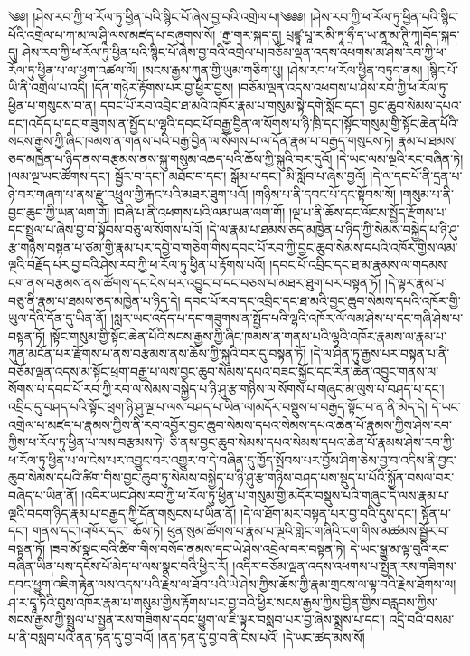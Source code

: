 \setcounter{footnote}{0} 
༄༅། །ཤེས་རབ་ཀྱི་ཕ་རོལ་ཏུ་ཕྱིན་པའི་སྙིང་པོ་ཞེས་བྱ་བའི་འགྲེལ་པ།༄༅༅། །ཤེས་རབ་ཀྱི་ཕ་རོལ་ཏུ་ཕྱིན་པའི་སྙིང་པོའི་འགྲེལ་པ་ཀ་མ་ལ་ཤཱི་ལས་མཛད་པ་བཞུགས་སོ། །རྒྱ་གར་སྐད་དུ། པྲཛྙཱ་པཱ་ར་མི་ཏཱ་ཧྲྀ་ད་ཡ་ནཱ་མ་ཊཱི་ཀཱ།བོད་སྐད་དུ། ཤེས་རབ་ཀྱི་ཕ་རོལ་ཏུ་ཕྱིན་པའི་སྙིང་པོ་ཞེས་བྱ་བའི་འགྲེལ་པ།བཅོམ་ལྡན་འདས་འཕགས་མ་ཤེས་རབ་ཀྱི་ཕ་རོལ་ཏུ་ཕྱིན་པ་ལ་ཕྱག་འཚལ་ལོ། །སངས་རྒྱས་ཀུན་གྱི་ཡུམ་གཅིག་པུ། །ཤེས་རབ་ཕ་རོལ་ཕྱིན་བཏུད་ནས། །སྙིང་པོ་ཡི་ནི་འགྲེལ་པ་འདི། །དོན་གཉེར་རྟོགས་པར་བྱ་ཕྱིར་བྱས། །བཅོམ་ལྡན་འདས་འཕགས་པ་ཤེས་རབ་ཀྱི་ཕ་རོལ་ཏུ་ཕྱིན་པ་གསུངས་བ་ན། དབང་པོ་རབ་འབྲིང་ཐ་མའི་འཁོར་རྣམ་པ་གསུམ་སྟེ་དགེ་སློང་དང་། བྱང་ཆུབ་སེམས་དཔའ་དང་།འདོད་པ་དང་གཟུགས་ན་སྤྱོད་པ་ལྷའི་དབང་པོ་བརྒྱ་བྱིན་ལ་སོགས་པ་ཉི་ཁྲི་དང་།སྟོང་གསུམ་གྱི་སྟོང་ཆེན་པོའི་སངས་རྒྱས་ཀྱི་ཞིང་ཁམས་ན་གནས་པའི་བརྒྱ་བྱིན་ལ་སོགས་པ་ལ་དོན་རྣམ་པ་བརྒྱད་གསུངས་ཏེ། རྣམ་པ་ཐམས་ཅད་མཁྱེན་པ་ཉིད་ནས་བརྩམས་ནས་སྐུ་གསུམ་འཆད་པའི་ཆོས་ཀྱི་སྐུའི་བར་དུའོ། །དེ་ཡང་ལམ་ལྔའི་རང་བཞིན་ཏེ། །ལམ་ལྔ་ཡང་ཚོགས་དང་། སྦྱོར་བ་དང་། མཐོང་བ་དང་། སྒོམ་པ་དང་། མི་སློབ་པ་ཞེས་བྱའོ། །དེ་ལ་དང་པོ་ནི་དྲན་པ་ཉེ་བར་གཞག་པ་ནས་རྫུ་འཕྲུལ་གྱི་རྐང་པའི་མཐར་ཐུག་པའོ། །གཉིས་པ་ནི་དབང་པོ་དང་སྟོབས་སོ། །གསུམ་པ་ནི་བྱང་ཆུབ་ཀྱི་ཡན་ལག་གོ། །བཞི་པ་ནི་འཕགས་པའི་ལམ་ཡན་ལག་གོ། །ལྔ་པ་ནི་ཆོས་དང་ལོངས་སྤྱོད་རྫོགས་པ་དང་སྤྲུལ་པ་ཞེས་བྱ་བ་སྟོབས་བཅུ་ལ་སོགས་པའོ། །དེ་ལ་རྣམ་པ་ཐམས་ཅད་མཁྱེན་པ་ཉིད་ཀྱི་སེམས་བསྐྱེད་པ་ཉི་ཤུ་རྩ་གཉིས་བསྟན་པ་ཙམ་གྱི་རྣམ་པར་དབྱེ་བ་གཅིག་གིས་དབང་པོ་རབ་ཀྱི་བྱང་ཆུབ་སེམས་དཔའི་འཁོར་གྱིས་ལམ་ལྔའི་བརྗོད་པར་བྱ་བའི་ཤེས་རབ་ཀྱི་ཕ་རོལ་ཏུ་ཕྱིན་པ་རྟོགས་པའོ། །དབང་པོ་འབྲིང་དང་ཐ་མ་རྣམས་ལ་གདམས་ངག་ནས་བརྩམས་ནས་ཚོགས་དང་ངེས་པར་འབྱུང་བ་དང་བཅས་པ་མཐར་ཐུག་པར་བསྟན་ཏོ། །དེ་ལྟར་རྣམ་པ་བཅུ་ནི་རྣམ་པ་ཐམས་ཅད་མཁྱེན་པ་ཉིད་དེ། དབང་པོ་རབ་དང་འབྲིང་དང་ཐ་མའི་བྱང་ཆུབ་སེམས་དཔའི་འཁོར་གྱི་ཡུལ་དེའི་དོན་དུ་ཡིན་ནོ། །སླར་ཡང་འདོད་པ་དང་གཟུགས་ན་སྤྱོད་པའི་ལྷའི་འཁོར་ལོ་ལམ་ཤེས་པ་དང་གཞི་ཤེས་པ་བསྟན་ཏོ། །སྟོང་གསུམ་གྱི་སྟོང་ཆེན་པོའི་སངས་རྒྱས་ཀྱི་ཞིང་ཁམས་ན་གནས་པའི་ལྷའི་འཁོར་རྣམས་ལ་རྣམ་པ་ཀུན་མངོན་པར་རྫོགས་པ་ནས་བརྩམས་ནས་ཆོས་ཀྱི་སྐུའི་བར་དུ་བསྟན་ཏོ། །དེ་ལ་ཤིན་ཏུ་རྒྱས་པར་བསྟན་པ་ནི་བཅོམ་ལྡན་འདས་མ་སྟོང་ཕྲག་བརྒྱ་པ་ལས་བྱང་ཆུབ་སེམས་དཔའ་བཟང་སྐྱོང་དང་རིན་ཆེན་འབྱུང་གནས་ལ་སོགས་པ་དབང་པོ་རབ་ཀྱི་རབ་ལ་སེམས་བསྐྱེད་པ་ཉི་ཤུ་རྩ་གཉིས་ལ་སོགས་པ་གཞུང་མ་ལུས་པ་བཤད་པ་དང་། འབྲིང་དུ་བཤད་པའི་སྟོང་ཕྲག་ཉི་ཤུ་ལྔ་པ་ལས་བཤད་པ་ཡིན་ལ།མདོར་བསྡུས་པ་བརྒྱད་སྟོང་པ་ན་ནི་མེད་དེ། དེ་ཡང་འགྲེལ་པ་མཛད་པ་རྣམས་ཀྱིས་ནི་རབ་འབྱོར་བྱང་ཆུབ་སེམས་དཔའ་སེམས་དཔའ་ཆེན་པོ་རྣམས་ཀྱིས་ཤེས་རབ་ཀྱིས་ཕ་རོལ་ཏུ་ཕྱིན་པ་ལས་བརྩམས་ཏེ། ཅི་ནས་བྱང་ཆུབ་སེམས་དཔའ་སེམས་དཔའ་ཆེན་པོ་རྣམས་ཤེས་རབ་ཀྱི་ཕ་རོལ་ཏུ་ཕྱིན་པ་ལ་ངེས་པར་འབྱུང་བར་འགྱུར་བ་དེ་བཞིན་དུ་ཁྱོད་སྤོབས་པར་བྱོས་ཤིག་ཅེས་བྱ་བ་འདིས་ནི་བྱང་ཆུབ་སེམས་དཔའི་ཚིག་གིས་བྱང་ཆུབ་ཏུ་སེམས་བསྐྱེད་པ་ཉི་ཤུ་རྩ་གཉིས་བཤད་པས་སྡུད་པ་པོའི་སྐྱོན་བསལ་བར་བཞེད་པ་ཡིན་ནོ། །འདིར་ཡང་ཤེས་རབ་ཀྱི་ཕ་རོལ་ཏུ་ཕྱིན་པ་གསུམ་གྱི་མདོར་བསྡུས་པའི་གཞུང་དེ་ལས་རྣམ་པ་ལྔའི་བདག་ཉིད་རྣམ་པ་བརྒྱད་ཀྱི་དོན་གསུངས་པ་ཡིན་ནོ། །དེ་ལ་ཐོག་མར་བསྟན་པར་བྱ་བའི་དུས་དང་། སྟོན་པ་དང་། གནས་དང་།འཁོར་དང་། ཆོས་ཏེ། ཕུན་སུམ་ཚོགས་པ་རྣམ་པ་ལྔའི་གླེང་གཞིའི་ངག་གིས་མཚམས་སྦྱོར་བ་བསྟན་ཏོ། །ཟབ་མོ་སྣང་བའི་ཚིག་གིས་བསོད་ནམས་དང་ཡེ་ཤེས་འབྲེལ་བར་བསྟན་ཏེ། དེ་ཡང་སྒྱུ་མ་ལྟ་བུའི་རང་བཞིན་ཡིན་པས་དངོས་པོ་མེད་པ་ལས་སྣང་བའི་ཕྱིར་རོ། །འདིར་བཅོམ་ལྡན་འདས་འཕགས་པ་སྤྱན་རས་གཟིགས་དབང་ཕྱུག་འཇིག་རྟེན་ལས་འདས་པའི་རྗེས་ལ་ཐོབ་པའི་ཡེ་ཤེས་ཀྱིས་ཆོས་ཀྱི་རྣམ་གྲངས་ལ་ལྟ་བའི་རྗེས་ཐོགས་ལ། ཤ་ར་དྭཱ་ཏིའི་བུས་འཁོར་རྣམ་པ་གསུམ་གྱིས་རྟོགས་པར་བྱ་བའི་ཕྱིར་སངས་རྒྱས་ཀྱིས་བྱིན་གྱིས་བརླབས་ཀྱིས་སངས་རྒྱས་ཀྱི་སྤྲུལ་པ་སྤྱན་རས་གཟིགས་དབང་ཕྱུག་ལ་ཇི་ལྟར་བསླབ་པར་བྱ་ཞེས་སྨྲས་པ་དང་། འདྲི་བའི་བསམ་པ་ནི་བསླབ་པའི་ནན་ཏན་དུ་བྱ་བའོ། །ནན་ཏན་དུ་བྱ་བ་ནི་ངེས་པའོ། །དེ་ཡང་ཚད་མས་སོ། 